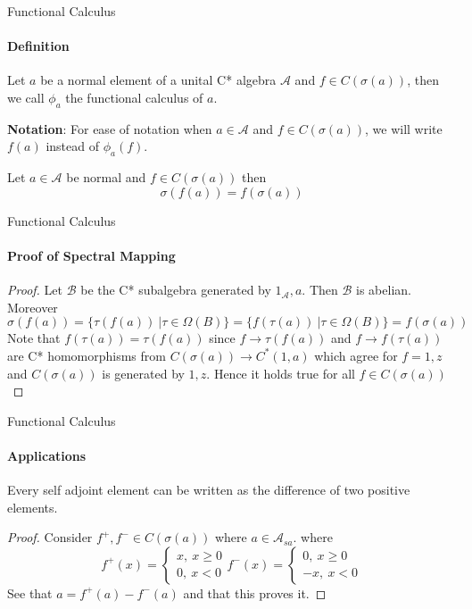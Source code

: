 \documentclass[handout, dvipsnames]{beamer}
\newcommand{\1}{\mathds{1}}	%
\begin{document}
\begin{frame}{Functional Calculus}
  \framesubtitle{Definition}
  \begin{definition}
    Let $a$ be a normal element of a unital C* algebra $\mathcal{A}$ and $f \in C(\sigma(a))$, then we call $\phi_a$ the functional calculus of $a$.
  \end{definition}
  \pause
  \textbf{Notation}: For ease of notation when $a \in \mathcal{A}$ and $f \in C(\sigma(a))$, we will write $f(a)$ instead of $\phi_a(f)$.

  \begin{theorem}
    Let $a \in \mathcal{A}$ be normal and $f \in C(\sigma(a))$ then $$\sigma(f(a)) = f(\sigma(a))$$
  \end{theorem}
\end{frame}

\begin{frame}{Functional Calculus}
  \framesubtitle{Proof of Spectral Mapping}
  \begin{proof}
    Let $\mathcal{B}$ be the C* subalgebra generated by $1_\mathcal{A}, a$. Then $\mathcal{B}$ is abelian. Moreover $$\sigma(f(a)) = \{\tau(f(a)) \ | \tau \in \Omega(B)\} = \{f(\tau(a)) \ | \tau \in \Omega(B) \} = f(\sigma(a))$$
    Note that $f(\tau(a)) = \tau(f(a))$ since $f \to \tau(f(a))$ and $f \to f(\tau(a))$ are C* homomorphisms from $C(\sigma(a)) \to C^*(1, a)$ which agree for $f = 1, z$ and $C(\sigma(a))$ is generated by $1, z$. Hence it holds true for all $f \in C(\sigma(a))$
  \end{proof}
\end{frame}

\begin{frame}{Functional Calculus}
  \framesubtitle{Applications}
  \begin{lemma}
    Every self adjoint element can be written as the difference of two positive elements.
  \end{lemma}
  \begin{proof}
    Consider $f^+, f^- \in C(\sigma(a))$ where $a \in \mathcal{A}_{sa}$. where $$f^+(x) = \begin{cases}
    x,  \ x \ge 0 \\
    0,  \ x < 0
  \end{cases}
   f^-(x) = \begin{cases}
     0, \ x \ge 0 \\
     -x, \ x < 0
   \end{cases}$$
  See that $a = f^+(a) - f^-(a)$ and that this proves it.
  \end{proof}
\end{frame}
\end{document}
